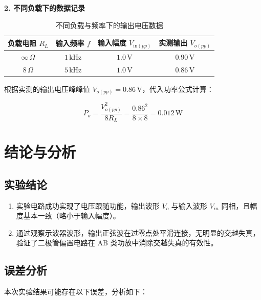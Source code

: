 \documentclass[UTF8, a4paper]{ctexrep} %
\begin{document}
\textbf{2. 不同负载下的数据记录}
\begin{table}[htbp]
    \centering
    \caption{不同负载与频率下的输出电压数据}
    \label{tab:test_data}
    \renewcommand{\arraystretch}{1.4} %
    \begin{tabular}{@{} c c c c @{}}
        \toprule
        \textbf{负载电阻} $R_L$ & \textbf{输入频率} $f$ & \textbf{输入幅度} $V_{\mathrm{in}(pp)}$ & \textbf{实测输出} $V_{o(pp)}$ \\
        \midrule
        $\infty\,\Omega$   & $1\,\text{kHz}$ & $1.0\,\text{V}$ & $0.90\,\text{V}$ \\
        
        $8\,\Omega$    & $5\,\text{kHz}$ & $1.0\,\text{V}$ & $0.86\,\text{V}$ \\
        \bottomrule
    \end{tabular}
\end{table}

根据实测的输出电压峰峰值 $V_{o(pp)} = 0.86\,\text{V}$，代入功率公式计算：

\begin{equation}
    P_o = \frac{V_{o(pp)}^2}{8 R_L} = \frac{0.86^2}{8 \times 8} = 0.012\,\text{W}
\end{equation}

\section{结论与分析}\label{sec:opamp_conclusion2}

\subsection{实验结论}
\begin{enumerate}
    \item 实验电路成功实现了电压跟随功能，输出波形 $V_o$ 与输入波形 $V_{in}$ 同相，且幅度基本一致（略小于输入幅度）。
    \item 通过观察示波器波形，输出正弦波在过零点处平滑连接，无明显的交越失真，验证了二极管偏置电路在 AB 类功放中消除交越失真的有效性。
\end{enumerate}

\subsection{误差分析}

本次实验结果可能存在以下误差，分析如下：
\end{document}

